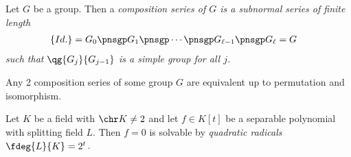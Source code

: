 \documentclass[a4paper]{article}
\begin{document}
\begin{tdefinition}
  Let \( G \) be a group.
  Then a \it{composition series} of \( G \) is a subnormal series of finite length
  \begin{align*}
    \left\{ Id. \right\} &= G_0 \pnsgp G_{1} \pnsgp \cdots \pnsgp G_{\ell-1} \pnsgp G_\ell = G
  \end{align*}
  such that \( \qg{G_j}{G_{j-1}} \) is a simple group for all \( j \).
\end{tdefinition}

\begin{ttheorem}
  Any 2 composition series of some group \( G \) are equivalent up to permutation and isomorphism.
\end{ttheorem}

\begin{ttheorem}
  Let \( K \) be a field with \( \chr K \neq 2 \) and let \( f\in K[t] \) be a separable polynomial with splitting field \( L \).
  Then \( f=0 \) is solvable by \it{quadratic} radicals \iff~\( \fdeg{L}{K}=2^t \).
\end{ttheorem}
\end{document}
